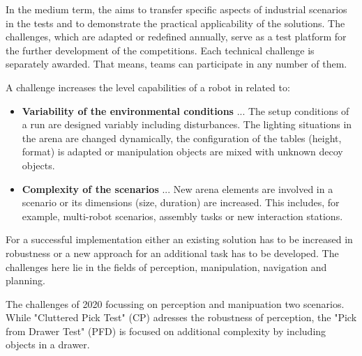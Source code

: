 
In the medium term, the \RCAW aims to transfer specific aspects of industrial scenarios in the tests and to demonstrate the practical applicability of the solutions. The challenges, which are adapted or redefined annually, serve as a test platform for the further development of the competitions. Each technical challenge is separately awarded. That means, teams can participate in any number of them.

A challenge increases the level capabilities of a robot in \RCAW related to:

\begin{itemize}
  \item \textbf{Variability of the environmental conditions} ... The setup conditions of a run are designed variably including disturbances. The lighting situations in the arena are changed dynamically, the configuration of the tables (height, format) is adapted or manipulation objects are mixed with unknown decoy objects.
  \item \textbf{Complexity of the scenarios} ... New arena elements are involved in a scenario
  or its dimensions (size, duration) are increased. This includes, for example, multi-robot scenarios, assembly tasks or new interaction stations.
\end{itemize}

For a successful implementation either an existing solution has to be increased in robustness or a new approach for an additional task has to be developed. The challenges here lie in the fields of perception, manipulation, navigation and planning.

\begin{figure}[h!]
  \centering
  \label{Examplary Challenge introducing a long term operation based on an extended Final test}
\end{figure}

The challenges of 2020 focussing on perception and manipuation two scenarios. While "Cluttered Pick Test" (CP) adresses the robustness of perception, the "Pick from Drawer Test" (PFD) is focused on additional complexity by including objects in a drawer.





